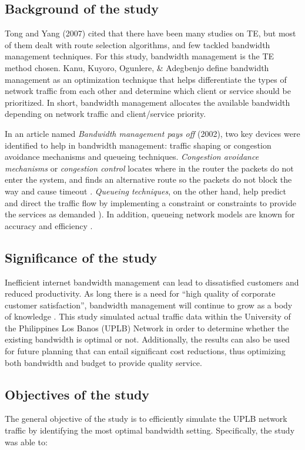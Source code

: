 \documentclass[journal]{IEEE/IEEEtran}
\begin{document}
\subsection{Background of the study}
Tong and Yang (2007)\cite{tong_yang_2007} cited that there have been many studies on TE, but most of them dealt with route selection algorithms, and few tackled bandwidth management techniques. For this study, bandwidth management is the TE method chosen. Kanu, Kuyoro, Ogunlere, \& Adegbenjo \cite{kanu_kuyoro_ogunlere_adegbenjo_2012} define bandwidth management as an optimization technique that helps differentiate the types of network traffic from each other and determine which client or service should be prioritized. In short, bandwidth management allocates the available bandwidth depending on network traffic and client/service priority.

In an article named \textit{Bandwidth management pays off} (2002)\cite{communication_news_2001}, two key devices were identified to help in bandwidth management: traffic shaping or congestion avoidance mechanisms and queueing techniques. \textit{Congestion avoidance mechanisms} or \textit{congestion control} locates where in the router the packets do not enter the system, and finds an alternative route so the packets do not block the way and cause timeout \cite{jacobson_1988}. \textit{Queueing techniques}, on the other hand, help predict and direct the traffic flow by implementing a constraint or constraints to provide the services as demanded \cite{gross_harris_1974}). In addition, queueing network models are known for accuracy and efficiency \cite{lazowska_zahorjan_graham_sevcik_1984}.

\subsection{Significance of the study}
Inefficient internet bandwidth management can lead to dissatisfied customers and reduced productivity. As long there is a need for “high quality of corporate customer satisfaction”, bandwidth management will continue to grow as a body of knowledge \cite{duzbeck_2006}. This study simulated actual traffic data within the University of the Philippines Los Banos (UPLB) Network in order to determine whether the existing bandwidth is optimal or not. Additionally, the results can also be used for future planning that can entail significant cost reductions, thus optimizing both bandwidth and budget to provide quality service.

\subsection{Objectives of the study}
The general objective of the study is to efficiently simulate the UPLB network traffic by identifying the most optimal bandwidth setting. Specifically, the study was able to:
\end{document}
